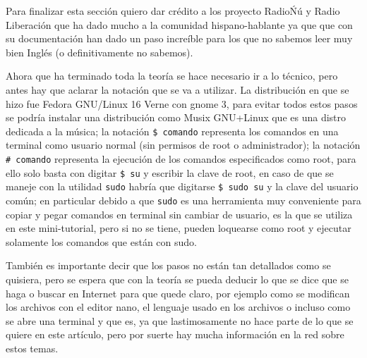\begin{multicols}{2}
Para finalizar esta sección quiero dar crédito a los proyecto RadioŃú y Radio Liberación que ha dado mucho a la comunidad hispano-hablante ya que que con su documentación han dado un paso increíble para los que no sabemos leer muy bien Inglés (o definitivamente no sabemos).


Ahora que ha terminado toda la teoría se hace necesario ir a lo técnico, pero antes hay que aclarar la notación que se va a utilizar. La distribución en que se hizo fue Fedora GNU/Linux 16 Verne con gnome 3, para evitar todos estos pasos se podría instalar una distribución como Musix GNU+Linux que es una distro dedicada a la música; la notación \verb!$ comando! representa los comandos en una terminal como usuario normal (sin permisos de root o administrador); la notación \verb!# comando! representa la ejecución de los comandos especificados como root, para ello solo basta con digitar \verb!$ su! y escribir la clave de root, en caso de que se maneje con la utilidad \verb!sudo! habría que digitarse \verb!$ sudo su! y la clave del usuario común; en particular debido a que \verb!sudo! es una herramienta muy conveniente para copiar y pegar comandos en terminal sin cambiar de usuario, es la que se utiliza en este mini-tutorial, pero si no se tiene, pueden loquearse como root y ejecutar solamente los comandos que están con sudo.

También es importante decir que los pasos no están tan detallados como se quisiera, pero se espera que con la teoría se pueda deducir lo que se dice que se haga o buscar en Internet para que quede claro, por ejemplo como se modifican los archivos con el editor nano, el lenguaje usado en los archivos o incluso como se abre una terminal y que es, ya que lastimosamente no hace parte de lo que se quiere en este artículo, pero por suerte hay mucha información en la red sobre estos temas.




\end{multicols}
